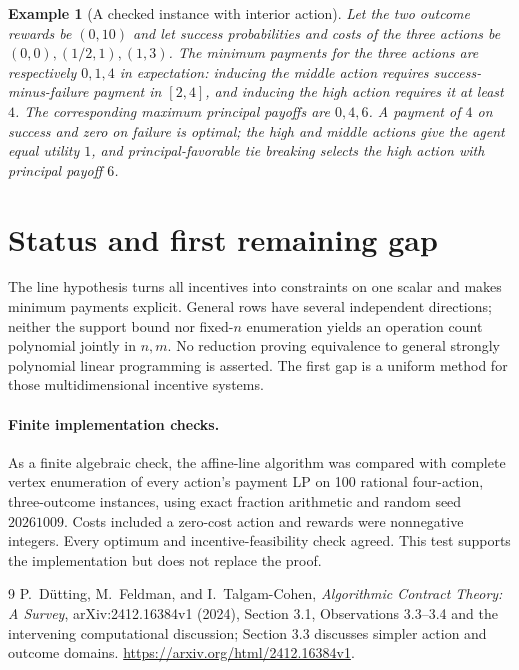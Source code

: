 \documentclass[11pt]{article}
\newtheorem{example}[theorem]{Example}
\theoremstyle{definition}
\begin{document}
\begin{example}[A checked instance with interior action]
Let the two outcome rewards be $(0,10)$ and let success probabilities and costs
of the three actions be $(0,0),(1/2,1),(1,3)$.
The minimum payments for the three actions are respectively $0,1,4$ in
expectation: inducing the middle action requires success-minus-failure payment
in $[2,4]$, and inducing the high action requires it at least $4$.
The corresponding maximum principal payoffs are $0,4,6$. A payment of $4$
on success and zero on failure is optimal; the high and middle actions give
the agent equal utility $1$, and principal-favorable tie breaking selects
the high action with principal payoff $6$.
\end{example}

\section{Status and first remaining gap}
The line hypothesis turns all incentives into constraints on one scalar and
makes minimum payments explicit. General rows have several independent
directions; neither the support bound nor fixed-$n$ enumeration yields an
operation count polynomial jointly in $n,m$. No reduction proving equivalence
to general strongly polynomial linear programming is asserted. The first gap
is a uniform method for those multidimensional incentive systems.

\paragraph{Finite implementation checks.}
As a finite algebraic check, the affine-line algorithm was compared with
complete vertex enumeration of every action's payment LP on 100 rational
four-action, three-outcome instances, using exact fraction arithmetic and
random seed $20261009$. Costs included a zero-cost action and rewards were
nonnegative integers. Every optimum and incentive-feasibility check agreed.
This test supports the implementation but does not replace the proof.

\begin{thebibliography}{9}
 P.~D\"utting, M.~Feldman, and I.~Talgam-Cohen,
\emph{Algorithmic Contract Theory: A Survey}, arXiv:2412.16384v1 (2024),
Section 3.1, Observations 3.3--3.4 and the intervening computational discussion;
Section 3.3 discusses simpler action and outcome domains.
\url{https://arxiv.org/html/2412.16384v1}.
\end{thebibliography}
\end{document}

